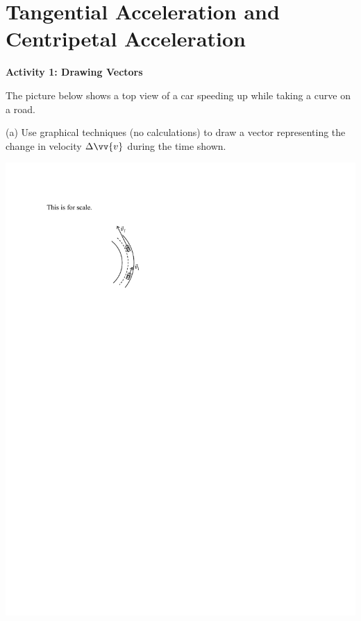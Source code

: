 \section{Tangential Acceleration and Centripetal Acceleration}

\makelabheader %

\bigskip

\textbf{Activity 1: Drawing Vectors}

The picture below shows a top view of a car speeding up while taking a curve on a road. 

(a)  Use graphical techniques (no calculations) to draw a vector representing the change in velocity $\Delta \vv{v}$ during the time shown.

\hspace{1.0in}\includegraphics{tangential_and_centripetal_acc/curve1.pdf}

